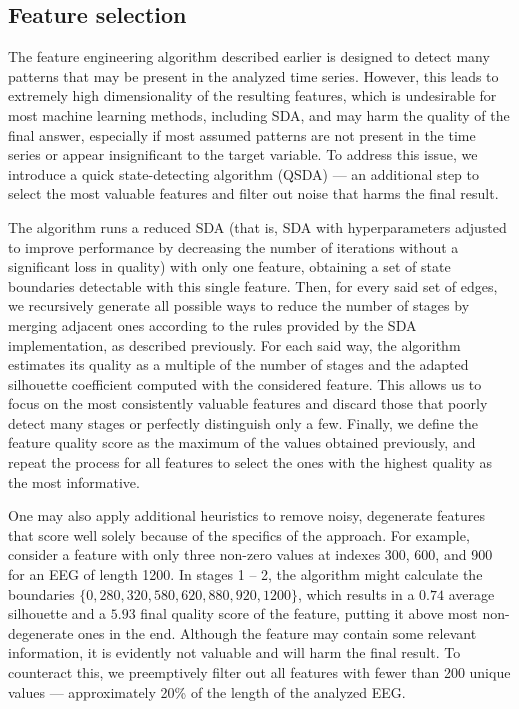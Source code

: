 \documentclass[journal,twoside,web]{ieeecolor2}
\begin{document}
\subsection{Feature selection}

The feature engineering algorithm described earlier is designed to detect many patterns that may be present in the analyzed time series. However, this leads to extremely high dimensionality of the resulting features, which is undesirable for most machine learning methods, including SDA, and may harm the quality of the final answer, especially if most assumed patterns are not present in the time series or appear insignificant to the target variable. To address this issue, we introduce a quick state-detecting algorithm (QSDA) --- an additional step to select the most valuable features and filter out noise that harms the final result. 

The algorithm runs a reduced SDA (that is, SDA with hyperparameters adjusted to improve performance by decreasing the number of iterations without a significant loss in quality) with only one feature, obtaining a set of state boundaries detectable with this single feature. Then, for every said set of edges, we recursively generate all possible ways to reduce the number of stages by merging adjacent ones according to the rules provided by the SDA implementation, as described previously. For each said way, the algorithm estimates its quality as a multiple of the number of stages and the adapted silhouette coefficient computed with the considered feature. This allows us to focus on the most consistently valuable features and discard those that poorly detect many stages or perfectly distinguish only a few. Finally, we define the feature quality score as the maximum of the values obtained previously, and repeat the process for all features to select the ones with the highest quality as the most informative.

One may also apply additional heuristics to remove noisy, degenerate features that score well solely because of the specifics of the approach. For example, consider a feature with only three non-zero values at indexes 300, 600, and 900 for an EEG of length 1200. In stages 1 -- 2, the algorithm might calculate the boundaries $\{ 0, 280, 320, 580, 620, 880, 920, 1200 \}$, which results in a $0.74$ average silhouette and a $5.93$ final quality score of the feature, putting it above most non-degenerate ones in the end. Although the feature may contain some relevant information, it is evidently not valuable and will harm the final result. To counteract this, we preemptively filter out all features with fewer than 200 unique values --- approximately 20\% of the length of the analyzed EEG.\@
\end{document}

